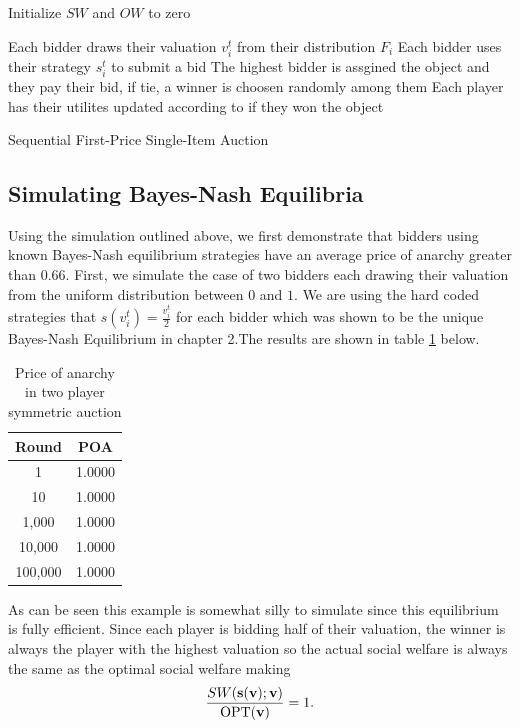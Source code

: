 \documentclass[12pt,twoside]{reedthesis}
\begin{document}
\begin{algorithm}[H]
	Initialize $SW$ and $OW$ to zero\\
	{
		Each bidder draws their valuation $v^t_i$ from their distribution $F_i$\;
		Each bidder uses their strategy $s^t_i$ to submit a bid\;
		The highest bidder is assgined the object and they pay their bid, if tie, a winner is choosen randomly among them\;
		Each player has their utilites updated according to if they won the object\;
	\caption{Sequential First-Price Single-Item Auction}
	}
\end{algorithm}


\subsection{Simulating Bayes-Nash Equilibria}
Using the simulation outlined above, we first demonstrate that bidders using known Bayes-Nash equilibrium strategies have an average price of anarchy greater than $0.66$. First, we simulate the case of two bidders each drawing their valuation from the uniform distribution between $0$ and $1$. We are using the hard coded strategies that $s(v^t_i) = \frac{v^t_i}{2}$ for each bidder which was shown to be the unique Bayes-Nash Equilibrium in chapter 2.The results are shown in table \ref{table:1} below.

\begin{table}[h!]
\begin{center}
\begin{tabular}{ |c|c| }
	\hline
	Round & POA \\
	\hline
	1 & 1.0000 \\
	10 & 1.0000 \\
	1,000 & 1.0000 \\
	10,000 & 1.0000 \\
	100,000 & 1.0000 \\
	\hline
\end{tabular}
\caption{Price of anarchy in two player symmetric auction}
\label{table:1}
\end{center} 
\end{table}

As can be seen this example is somewhat silly to simulate since this equilibrium is fully efficient. Since each player is bidding half of their valuation, the winner is always the player with the highest valuation so the actual social welfare is always the same as the optimal social welfare making $$\frac{SW(\textbf{s}(\textbf{v}); \textbf{v})}{\text{OPT}(\textbf{v})} = 1.$$
\end{document}
